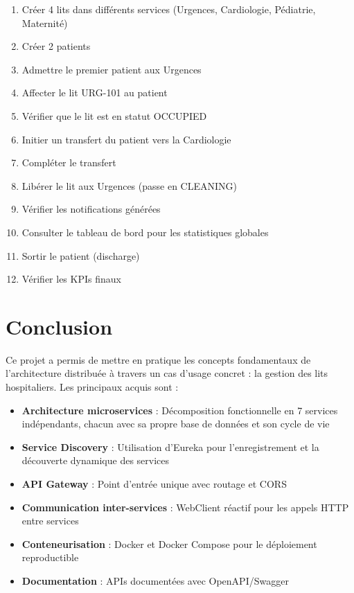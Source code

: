 \documentclass[12pt,a4paper]{report}
\begin{document}
\begin{enumerate}
    \item Cr\'eer 4 lits dans diff\'erents services (Urgences, Cardiologie, P\'ediatrie, Maternit\'e)
    \item Cr\'eer 2 patients
    \item Admettre le premier patient aux Urgences
    \item Affecter le lit URG-101 au patient
    \item V\'erifier que le lit est en statut OCCUPIED
    \item Initier un transfert du patient vers la Cardiologie
    \item Compl\'eter le transfert
    \item Lib\'erer le lit aux Urgences (passe en CLEANING)
    \item V\'erifier les notifications g\'en\'er\'ees
    \item Consulter le tableau de bord pour les statistiques globales
    \item Sortir le patient (discharge)
    \item V\'erifier les KPIs finaux
\end{enumerate}

\chapter{Conclusion}

Ce projet a permis de mettre en pratique les concepts fondamentaux de l'architecture distribu\'ee \`a travers un cas d'usage concret : la gestion des lits hospitaliers. Les principaux acquis sont :

\begin{itemize}
    \item \textbf{Architecture microservices} : D\'ecomposition fonctionnelle en 7 services ind\'ependants, chacun avec sa propre base de donn\'ees et son cycle de vie
    \item \textbf{Service Discovery} : Utilisation d'Eureka pour l'enregistrement et la d\'ecouverte dynamique des services
    \item \textbf{API Gateway} : Point d'entr\'ee unique avec routage et CORS
    \item \textbf{Communication inter-services} : WebClient r\'eactif pour les appels HTTP entre services
    \item \textbf{Conteneurisation} : Docker et Docker Compose pour le d\'eploiement reproductible
    \item \textbf{Documentation} : APIs document\'ees avec OpenAPI/Swagger
\end{itemize}
\end{document}
